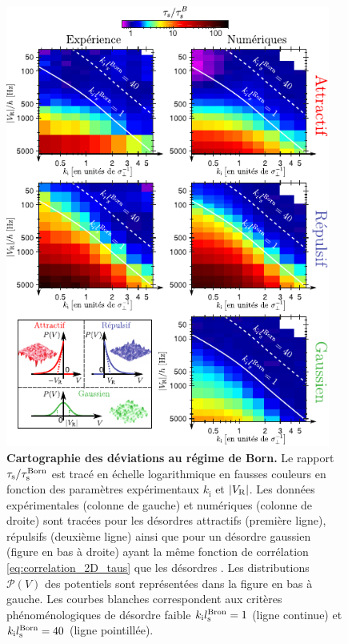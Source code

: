 \begin{figure}
\centering
\includegraphics[width=0.95\textwidth]{Fig/TauS_PRL/map_deviations_born.pdf}
\caption{\textbf{Cartographie des déviations au régime de Born.} Le rapport $\tau_{\mathrm{s}}/\tau_{\mathrm{s}}^{\mathrm{Born}}$ est tracé en échelle logarithmique en fausses couleurs en fonction des paramètres expérimentaux $k_{\mathrm{i}}$ et $|V_{\mathrm{R}}|$. Les données expérimentales (colonne de gauche) et numériques (colonne de droite) sont tracées pour les désordres attractifs (première ligne), répulsifs (deuxième ligne) ainsi que pour un désordre gaussien (figure en bas à droite) ayant la même fonction de corrélation \ref{eq:correlation_2D_taus} que les désordres \speckle . Les distributions $\mathcal{P}(V)$ des potentiels sont représentées dans la figure en bas à gauche. Les courbes blanches correspondent aux critères phénoménologiques de désordre faible $k_{\mathrm{i}}l_{\mathrm{s}}^{\mathrm{Bron}}=1$ (ligne continue) et $k_{\mathrm{i}}l_{\mathrm{s}}^{\mathrm{Born}}=40$ (ligne pointillée). }
\label{fig:map_deviations_born}
\end{figure}

